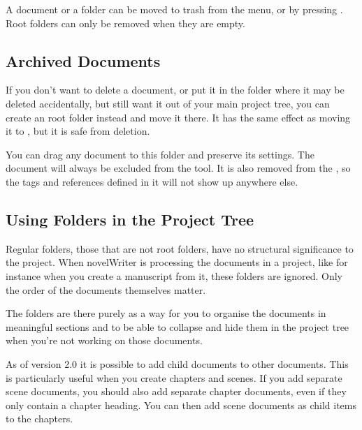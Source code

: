\documentclass[a4paper,11pt,english]{sphinxmanual}
\begin{document}
\sphinxAtStartPar
A document or a folder can be moved to trash from the  menu, or by pressing
. Root folders can only be removed when they are empty.


\subsection{Archived Documents}
\label{\detokenize{project_overview:archived-documents}}\label{\detokenize{project_overview:a-proj-roots-out}}
\sphinxAtStartPar
If you don’t want to delete a document, or put it in the  folder where it may be deleted
accidentally, but still want it out of your main project tree, you can create an  root
folder instead and move it there. It has the same effect as moving it to , but it is safe
from deletion.

\sphinxAtStartPar
You can drag any document to this folder and preserve its settings. The document will always be
excluded from the  tool. It is also removed from the {\hyperref[\detokenize{int_glossary:term-Project-Index}]{}}, so
the tags and references defined in it will not show up anywhere else.


\subsection{Using Folders in the Project Tree}
\label{\detokenize{project_overview:using-folders-in-the-project-tree}}\label{\detokenize{project_overview:a-proj-roots-dirs}}
\sphinxAtStartPar
Regular folders, those that are not root folders, have no structural significance to the project.
When novelWriter is processing the documents in a project, like for instance when you create a
manuscript from it, these folders are ignored. Only the order of the documents themselves matter.

\sphinxAtStartPar
The folders are there purely as a way for you to organise the documents in meaningful sections and
to be able to collapse and hide them in the project tree when you’re not working on those
documents.

\sphinxAtStartPar
{}As of version 2.0 it is possible to add child documents to other documents. This is particularly
useful when you create chapters and scenes. If you add separate scene documents, you should also
add separate chapter documents, even if they only contain a chapter heading. You can then add
scene documents as child items to the chapters.
\end{document}
